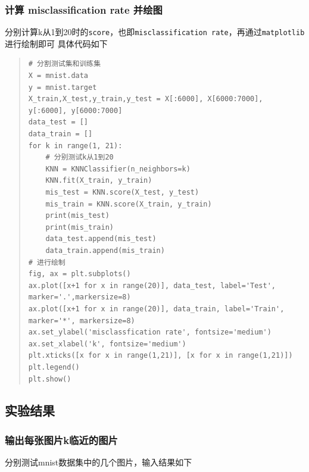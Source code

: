 \documentclass[UTF8]{ctexart}
\begin{document}
\subsubsection{计算 misclassification rate 并绘图}
分别计算k从1到20时的\lstinline{score}，也即\lstinline{misclassification rate}，再通过\lstinline{matplotlib}进行绘制即可
具体代码如下

\begin{quote}
    \begin{lstlisting}[breaklines, title=计算 misclassification rate]
# 分割测试集和训练集
X = mnist.data
y = mnist.target
X_train,X_test,y_train,y_test = X[:6000], X[6000:7000], y[:6000], y[6000:7000]
data_test = []
data_train = []
for k in range(1, 21):
    # 分别测试k从1到20
    KNN = KNNClassifier(n_neighbors=k)
    KNN.fit(X_train, y_train)
    mis_test = KNN.score(X_test, y_test)
    mis_train = KNN.score(X_train, y_train)
    print(mis_test)
    print(mis_train)
    data_test.append(mis_test)
    data_train.append(mis_train)
# 进行绘制
fig, ax = plt.subplots()
ax.plot([x+1 for x in range(20)], data_test, label='Test', marker='.',markersize=8)
ax.plot([x+1 for x in range(20)], data_train, label='Train', marker='*', markersize=8)
ax.set_ylabel('misclassfication rate', fontsize='medium')
ax.set_xlabel('k', fontsize='medium')
plt.xticks([x for x in range(1,21)], [x for x in range(1,21)])
plt.legend()
plt.show()
    \end{lstlisting}
\end{quote}



\newpage
\subsection{实验结果}
\subsubsection{输出每张图片k临近的图片}
分别测试mnist数据集中的几个图片，输入结果如下
\end{document}
